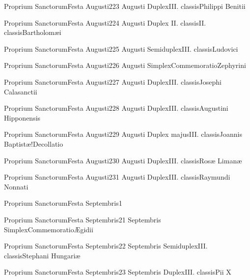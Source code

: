 \documentclass[invitatoriale-romanum.tex]{subfiles}
\begin{document}
	{Proprium Sanctorum}{Festa Augusti}{2}{23 Augusti}
	{Duplex}{III. classis}{Philippi Benitii}
	{}
	{}

	{Proprium Sanctorum}{Festa Augusti}{2}{24 Augusti}
	{Duplex II. classis}{II. classis}{Bartholomæi}
	{}
	{}

	{Proprium Sanctorum}{Festa Augusti}{2}{25 Augusti}
	{Semiduplex}{III. classis}{Ludovici}
	{}
	{}

	{Proprium Sanctorum}{Festa Augusti}{2}{26 Augusti}
	{Simplex}{Commemoratio}{Zephyrini}
	{}
	{\invitferia}

	{Proprium Sanctorum}{Festa Augusti}{2}{27 Augusti}
	{Duplex}{III. classis}{Josephi Calasanctii}
	{}
	{}

	{Proprium Sanctorum}{Festa Augusti}{2}{28 Augusti}
	{Duplex}{III. classis}{Augustini Hipponensis}
	{}
	{}

	{Proprium Sanctorum}{Festa Augusti}{2}{29 Augusti}
	{Duplex majus}{III. classis}{Joannis Baptistæ!Decollatio}
	{}
	{}

	{Proprium Sanctorum}{Festa Augusti}{2}{30 Augusti}
	{Duplex}{III. classis}{Rosæ Limanæ}
	{}
	{}

	{Proprium Sanctorum}{Festa Augusti}{2}{31 Augusti}
	{Duplex}{III. classis}{Raymundi Nonnati}
	{}
	{}


	{Proprium Sanctorum}{Festa Septembris}{1}{}
	{}{}{}{}{}

	{Proprium Sanctorum}{Festa Septembris}{2}{1 Septembris}
	{Simplex}{Commemoratio}{Ægidii}
	{}
	{\invitferia}

	{Proprium Sanctorum}{Festa Septembris}{2}{2 Septembris}
	{Semiduplex}{III. classis}{Stephani Hungariæ}
	{}
	{}

	{Proprium Sanctorum}{Festa Septembris}{2}{3 Septembris}
	{Duplex}{III. classis}{Pii X}
	{}
	{}
\end{document}
